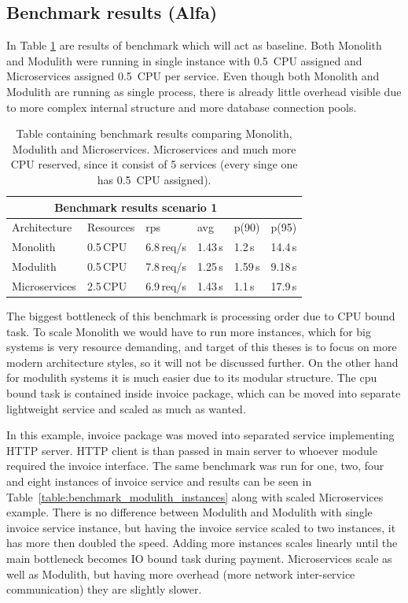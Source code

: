 \subsection{Benchmark results (Alfa)}

In Table \ref{table:benchmark_baseline} are results of benchmark which will act as baseline. Both Monolith and Modulith were running in single instance with 0.5~CPU assigned and Microservices assigned 0.5~CPU per service. Even though both Monolith and Modulith are running as single process, there is already little overhead visible due to more complex internal structure and more database connection pools.

\begin{table}
    \begin{tabular}{ |p{3cm}||p{3cm}|p{1.5cm}|p{1.5cm}|p{1.5cm}|p{1.5cm}| }
        \hline
        \multicolumn{5}{|c|}{Benchmark results scenario 1}                   \\
        \hline
        Architecture  & Resources & rps        & avg     & p(90)   & p(95)   \\
        \hline
        Monolith      & 0.5\,CPU  & 6.8\,req/s & 1.43\,s & 1.2\,s  & 14.4\,s \\
        Modulith      & 0.5\,CPU  & 7.8\,req/s & 1.25\,s & 1.59\,s & 9.18\,s \\
        Microservices & 2.5\,CPU  & 6.9\,req/s & 1.43\,s & 1.1\,s  & 17.9\,s \\
        \hline
    \end{tabular}
    \caption{Table containing benchmark results comparing Monolith, Modulith and Microservices. Microservices and much more CPU reserved, since it consist of 5 services (every singe one has 0.5~CPU assigned).\label{table:benchmark_baseline}}
\end{table}

The biggest bottleneck of this benchmark is processing order due to CPU bound task. To scale Monolith we would have to run more instances, which for big systems is very resource demanding, and target of this theses is to focus on more modern architecture styles, so it will not be discussed further. On the other hand for modulith systems it is much easier due to its modular structure. The cpu bound task is contained inside invoice package, which can be moved into separate lightweight service and scaled as much as wanted.

In this example, invoice package was moved into separated service implementing HTTP server. HTTP client is than passed in main server to whoever module required the invoice interface. The same benchmark was run for one, two, four and eight instances of invoice service and results can be seen in Table~\ref{table:benchmark_modulith_instances} along with scaled Microservices example. There is no difference between Modulith and Modulith with single invoice service instance, but having the invoice service scaled to two instances, it has more then doubled the speed. Adding more instances scales linearly until the main bottleneck becomes IO bound task during payment. Microservices scale as well as Modulith, but having more overhead (more network inter-service communication) they are slightly slower.

